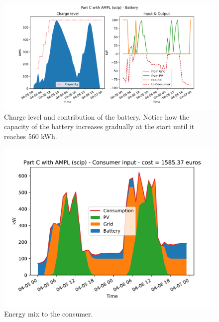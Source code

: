 \documentclass[12pt]{article}
\begin{document}
\begin{figure}[p]
    \centering
    \includegraphics[width=\textwidth]{PartC/battery}
    \caption{Charge level and contribution of the battery. Notice how the capacity of the battery increases gradually at the start until it reaches 560 kWh.}
\end{figure}

\begin{figure}[p]
    \centering
    \includegraphics[width=\textwidth]{PartC/consumer_input}
    \caption{Energy mix to the consumer.}
\end{figure}
\end{document}
